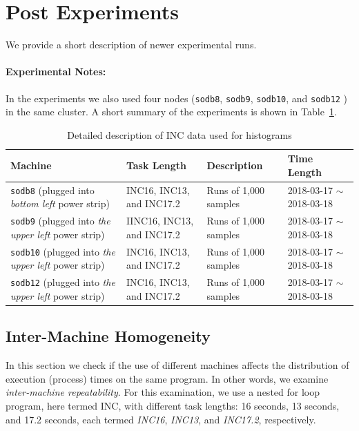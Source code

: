 
\clearpage
\newpage

\section{Post Experiments}

We provide a short description of newer experimental runs. 

\paragraph{Experimental Notes:} In the experiments 
we also used four nodes ({\tt sodb8}, {\tt sodb9}, {\tt sodb10}, and {\tt sodb12} ) in the same cluster. 
A short summary of the experiments is shown in Table~\ref{tab:exp_notes2}.

\begin{table}[h]
\begin{center}
\begin{tabular}{|p{4cm}|p{3cm}|p{4cm}|p{4cm}|} \hline
Machine & Task Length & Description & Time Length\\ \hline
{\tt sodb8} (plugged into {\em bottom left} power strip) &  INC16, INC13, and INC17.2 & Runs of 1,000 samples & 2018-03-17 $\sim$2018-03-18\\ \hline
{\tt sodb9}  (plugged into {\em the upper left} power strip) &  IINC16, INC13, and INC17.2 & Runs of 1,000 samples & 2018-03-17 $\sim$2018-03-18\\ \hline
{\tt sodb10} (plugged into {\em the upper left} power strip)  & INC16, INC13, and INC17.2 & Runs of 1,000 samples & 2018-03-17 $\sim$2018-03-18\\ \hline
{\tt sodb12} (plugged into {\em the upper left} power strip) & INC16, INC13, and INC17.2 & Runs of 1,000 samples & 2018-03-17 $\sim$2018-03-18\\ \hline
\end{tabular}
\end{center}
\vspace{-.2in}
\caption{Detailed description of INC data used for histograms\label{tab:exp_notes2}}
\end{table}

\subsection{Inter-Machine Homogeneity~\label{sec:diff_machine}} 

In this section we check if the use of different machines affects the distribution of execution (process) times on the same program. 
In other words, we examine {\em inter-machine repeatability}. For this examination, we use a nested for loop program, here termed INC, 
with different task lengths: 16 seconds, 13 seconds, and 17.2 seconds, each termed {\em INC16}, {\em INC13}, and {\em INC17.2}, respectively. 

